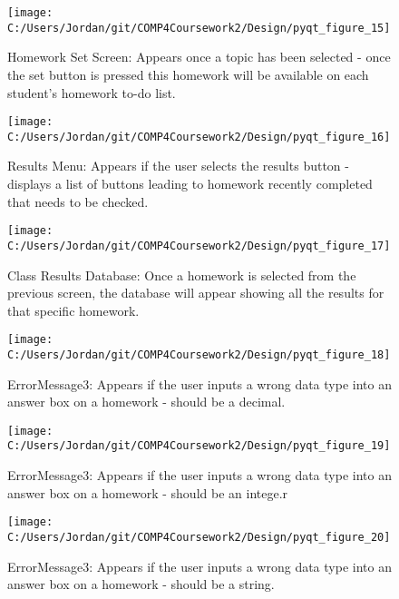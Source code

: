 \begin{figure}[H]
    \label{fig:print_function_result}\caption{Homework Set Screen: Appears once a topic has been selected - once the set button is pressed this homework will be available on each student's homework to-do list.}
    \texttt{[image: C:/Users/Jordan/git/COMP4Coursework2/Design/pyqt\_figure\_15]}
\end{figure}

\begin{figure}[H]
    \label{fig:print_function_result}\caption{Results Menu: Appears if the user selects the results button - displays a list of buttons leading to homework recently completed that needs to be checked.}
    \texttt{[image: C:/Users/Jordan/git/COMP4Coursework2/Design/pyqt\_figure\_16]}
\end{figure}

\begin{figure}[H]
    \label{fig:print_function_result}\caption{Class Results Database: Once a homework is selected from the previous screen, the database will appear showing all the results for that specific homework.}
    \texttt{[image: C:/Users/Jordan/git/COMP4Coursework2/Design/pyqt\_figure\_17]}
\end{figure}

\begin{figure}[H]
    \label{fig:print_function_result}\caption{ErrorMessage3: Appears if the user inputs a wrong data type into an answer box on a homework - should be a decimal.}
    \texttt{[image: C:/Users/Jordan/git/COMP4Coursework2/Design/pyqt\_figure\_18]}
\end{figure}

\begin{figure}[H]
    \label{fig:print_function_result}\caption{ErrorMessage3: Appears if the user inputs a wrong data type into an answer box on a homework - should be an intege.r}
    \texttt{[image: C:/Users/Jordan/git/COMP4Coursework2/Design/pyqt\_figure\_19]}
\end{figure}

\begin{figure}[H]
    \label{fig:print_function_result}\caption{ErrorMessage3: Appears if the user inputs a wrong data type into an answer box on a homework - should be a string.}
    \texttt{[image: C:/Users/Jordan/git/COMP4Coursework2/Design/pyqt\_figure\_20]}
\end{figure}


